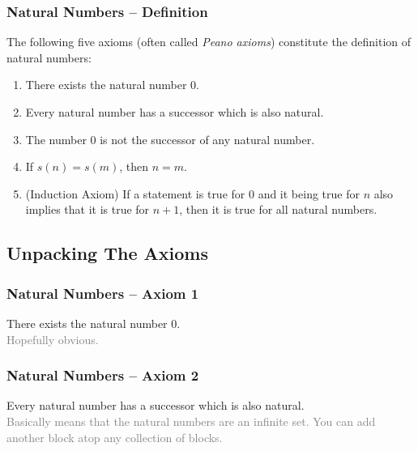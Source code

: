 \documentclass[aspectratio=169,11pt,svgnames]{beamer}
\begin{document}
\begin{frame}
 \frametitle{Natural Numbers -- Def\hspace*{0pt}inition}
 The following \alert{five axioms} (often called \emph{Peano axioms}) constitute
 the definition of natural numbers:
 \pause
 \begin{enumerate}
  \item There exists the natural number $0$.
  \pause
  \item Every natural number has a successor which is also natural.
  \pause
  \item The number $0$ is not the successor of any natural number.
  \pause
  \item If $s(n) = s(m)$, then $n = m$.
  \pause
  \item (Induction Axiom) If a statement is true for $0$ and it being true for
   $n$ also implies that it is true for $n + 1$, then it is true for all natural
   numbers.
 \end{enumerate}
\end{frame}

\subsection{Unpacking The Axioms}

\begin{frame}
 \subsectionpage
\end{frame}

\begin{frame}
 \frametitle{Natural Numbers -- Axiom 1}
 \begin{center}
  \Large There exists the natural number $0$.\\
  \pause
  \vspace{\parskip}
  \normalsize\textcolor{Gray}{Hopefully obvious.}
 \end{center}
\end{frame}

\begin{frame}
 \frametitle{Natural Numbers -- Axiom 2}
 \begin{center}
  \Large Every natural number has a successor which is also natural.\\
  \pause
  \vspace{\parskip}
  \normalsize\textcolor{Gray}{Basically means that the natural numbers are an
  infinite set. You can add another block atop any collection of blocks.}
 \end{center}
\end{frame}
\end{document}

